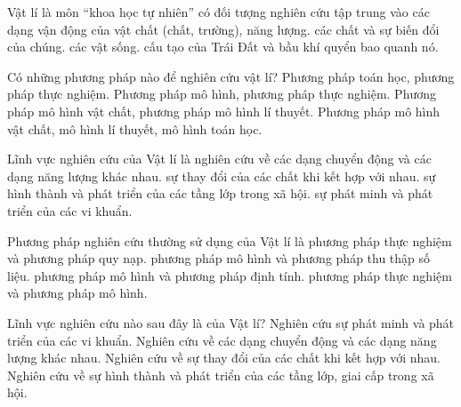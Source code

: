 \begin{ex}
Vật lí là môn “khoa học tự nhiên” có đối tượng nghiên cứu tập trung vào
\choice
{\True các dạng vận động của vật chất (chất, trường), năng lượng.}
{các chất và sự biến đổi của chúng.}
{các vật sống.}
{cấu tạo của Trái Đất và bầu khí quyển bao quanh nó.}
\end{ex}

\begin{ex}
Có những phương pháp nào để nghiên cứu vật lí?
\choice
{Phương pháp toán học, phương pháp thực nghiệm.}
{\True Phương pháp mô hình, phương pháp thực nghiệm.}
{Phương pháp mô hình vật chất, phương pháp mô hình lí thuyết.}
{Phương pháp mô hình vật chất, mô hình lí thuyết, mô hình toán học.}
\end{ex}

\begin{ex}
Lĩnh vực nghiên cứu của Vật lí là nghiên cứu về
\choice
{\True các dạng chuyển động và các dạng năng lượng khác nhau.}
{sự thay đổi của các chất khi kết hợp với nhau.}
{sự hình thành và phát triển của các tầng lớp trong xã hội.}
{sự phát minh và phát triển của các vi khuẩn.}
\end{ex}

\begin{ex}
Phương pháp nghiên cứu thường sử dụng của Vật lí là
\choice
{phương pháp thực nghiệm và phương pháp quy nạp.}
{phương pháp mô hình và phương pháp thu thập số liệu.}
{phương pháp mô hình và phương pháp định tính.}
{\True phương pháp thực nghiệm và phương pháp mô hình.}
\end{ex}

\begin{ex}
Lĩnh vực nghiên cứu nào sau đây là của Vật lí?
\choice
{Nghiên cứu sự phát minh và phát triển của các vi khuẩn.}
{\True Nghiên cứu về các dạng chuyển động và các dạng năng lượng khác nhau.}
{Nghiên cứu về sự thay đổi của các chất khi kết hợp với nhau.}
{Nghiên cứu về sự hình thành và phát triển của các tầng lớp, giai cấp trong xã hội.}
\end{ex}

